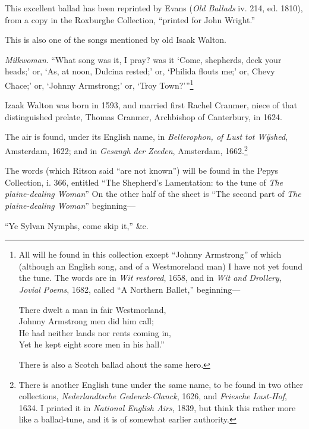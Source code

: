 This excellent ballad has been reprinted by Evans (\textit{Old Ballads} iv. 214,
ed. 1810), from a copy in the Roxburghe Collection, “printed for John Wright.”
\pagebreak




This is also one of the songs mentioned by old Isaak Walton.

\textit{Milkwoman}. “What song was it, I pray? was it ‘Come, shepherds, deck your
heads;’ or, ‘As, at noon, Dulcina rested;’ or, ‘Philida flouts me;’ or, Chevy
Chace;’ or, ‘Johnny Armstrong;’ or, ‘Troy Town?’”\footnote{\textit{}
All will he found in this collection except “Johnny
Armstrong” of which (although an English song, and of
a Westmoreland man) I have not yet found the tune. The
words are in \textit{Wit restored}, 1658, and in \textit{Wit and Drollery,
Jovial Poems}, 1682, called “A Northern Ballet,” beginning—
\settowidth{\versewidth}{There dwelt a man in fair Westmorland,}
\begin{fnverse}
\begin{altverse}
There dwelt a man in fair Westmorland,\\
Johnny Armstrong men did him call;\\
He had neither lands nor rents coming in,\\
Yet he kept eight score men in his hall.”
\end{altverse}
\end{fnverse}
There is also a Scotch ballad ahout the same hero.}

Izaak Walton was born in 1593, and married first Rachel Cranmer, niece of
that distinguished prelate, Thomas Cranmer, Archbishop of Canterbury, in 1624.

The air is found, under its English name, in \textit{Bellerophon, of Lust tot Wÿshed},
Amsterdam, 1622; and in \textit{Gesangh der Zeeden}, Amsterdam, 1662.\footnote{\textit{}
There is another English tune under the same name,
to be found in two other collections, \textit{Nederlandtsche Gedenck-Clanck},
 1626, and \textit{Friesche Lust-Hof}, 1634. I printed
it in \textit{National English Airs}, 1839, but think this rather
more like a ballad-tune, and it is of somewhat earlier
authority.}


The words (which Ritson said “are not known”) will be found in the Pepys
Collection, i. 366, entitled “The Shepherd’s \pagebreak Lamentation: to the tune of
\textit{The plaine-dealing Woman}” On the other half of the sheet is “The second part
of \textit{The plaine-dealing Woman}” beginning—
\settowidth{\versewidth}{“Ye Sylvan Nymphs, come skip it,” \&c.}
\begin{scverse}
“Ye Sylvan Nymphs, come skip it,” \&c.
\end{scverse}

